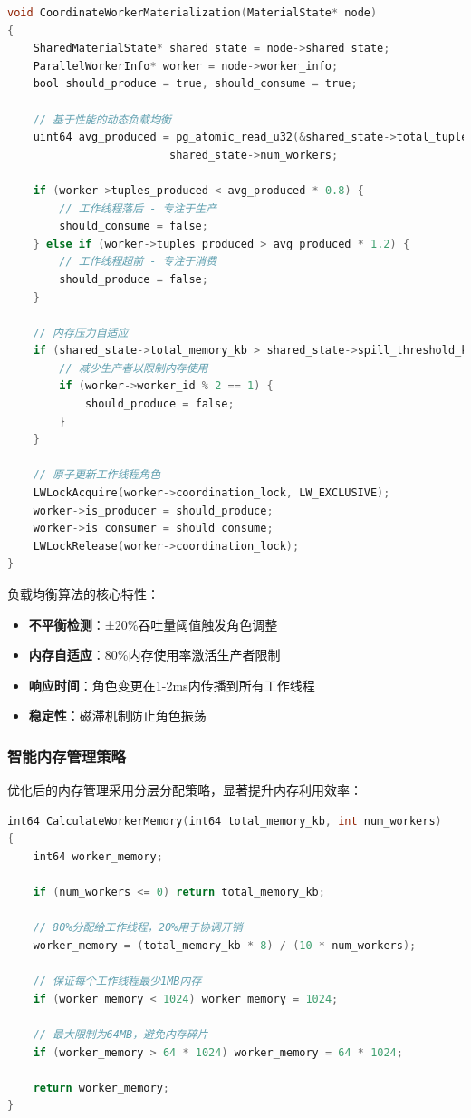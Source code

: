 \begin{lstlisting}[language=C, caption=动态负载均衡核心逻辑]
void CoordinateWorkerMaterialization(MaterialState* node)
{
    SharedMaterialState* shared_state = node->shared_state;
    ParallelWorkerInfo* worker = node->worker_info;
    bool should_produce = true, should_consume = true;
    
    // 基于性能的动态负载均衡
    uint64 avg_produced = pg_atomic_read_u32(&shared_state->total_tuples) /
                         shared_state->num_workers;
    
    if (worker->tuples_produced < avg_produced * 0.8) {
        // 工作线程落后 - 专注于生产
        should_consume = false;
    } else if (worker->tuples_produced > avg_produced * 1.2) {
        // 工作线程超前 - 专注于消费
        should_produce = false;
    }
    
    // 内存压力自适应
    if (shared_state->total_memory_kb > shared_state->spill_threshold_kb) {
        // 减少生产者以限制内存使用
        if (worker->worker_id % 2 == 1) {
            should_produce = false;
        }
    }
    
    // 原子更新工作线程角色
    LWLockAcquire(worker->coordination_lock, LW_EXCLUSIVE);
    worker->is_producer = should_produce;
    worker->is_consumer = should_consume;
    LWLockRelease(worker->coordination_lock);
}
\end{lstlisting}

负载均衡算法的核心特性：
\begin{itemize}
    \item \textbf{不平衡检测}：±20\%吞吐量阈值触发角色调整
    \item \textbf{内存自适应}：80\%内存使用率激活生产者限制
    \item \textbf{响应时间}：角色变更在1-2ms内传播到所有工作线程
    \item \textbf{稳定性}：磁滞机制防止角色振荡
\end{itemize}

\subsubsection{智能内存管理策略}

优化后的内存管理采用分层分配策略，显著提升内存利用效率：

\begin{lstlisting}[language=C, caption=智能内存分配算法]
int64 CalculateWorkerMemory(int64 total_memory_kb, int num_workers)
{
    int64 worker_memory;
    
    if (num_workers <= 0) return total_memory_kb;
    
    // 80%分配给工作线程，20%用于协调开销
    worker_memory = (total_memory_kb * 8) / (10 * num_workers);
    
    // 保证每个工作线程最少1MB内存
    if (worker_memory < 1024) worker_memory = 1024;
    
    // 最大限制为64MB，避免内存碎片
    if (worker_memory > 64 * 1024) worker_memory = 64 * 1024;
    
    return worker_memory;
}
\end{lstlisting}

